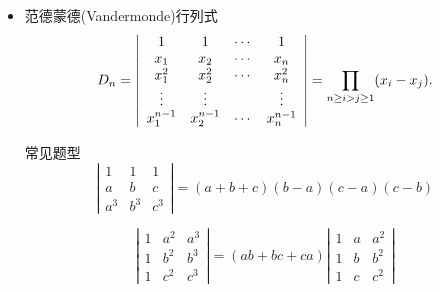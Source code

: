 \begin{frame}
  
    \begin{itemize}
    \item 范德蒙德(Vandermonde)行列式
        $$
        D_n = \left|
        \begin{array}{cccc}
          1        &  1        & \cdots &    1     \\                    
          x_1      &  x_2      & \cdots &    x_n    \\ 
          x_1^2    &  x_2^2     & \cdots &   x_n^2   \\ 
          \vdots      &  \vdots      &     &    \vdots      \\
          x_1^{n-1} & x_2^{n-1} &  \cdots &  x_n^{n-1}
        \end{array}
        \right|
        = \prod_{n \ge i > j \ge 1}(x_i-x_j).
        $$
        
        \begin{exampleblock}{常见题型}
        $$
        \left|
        \begin{array}{ccc}
          1   &   1   &   1\\
          a   &   b   &   c\\
          a^3 &   b^3 &   c^3
        \end{array}
        \right|=(a+b+c)(b-a)(c-a)(c-b)
        $$\vspace{0.1in}
        
        $$
        \left|
        \begin{array}{ccc}
          1&a^2&a^3\\
          1&b^2&b^3\\
          1&c^2&c^3
        \end{array}
        \right|=(ab+bc+ca)
        \left|
        \begin{array}{ccc}
          1&a&a^2\\
          1&b&b^2\\
          1&c&c^2
        \end{array}
        \right|
        $$
      \end{exampleblock}

    \end{itemize}
  
\end{frame}
